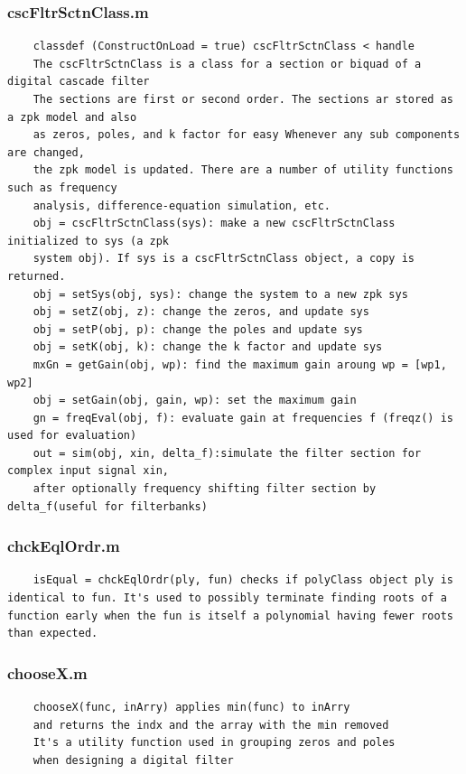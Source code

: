 \documentclass[]{article}
\begin{document}
\subsubsection*{cscFltrSctnClass.m}
\begin{lstlisting}
    classdef (ConstructOnLoad = true) cscFltrSctnClass < handle
    The cscFltrSctnClass is a class for a section or biquad of a digital cascade filter
    The sections are first or second order. The sections ar stored as a zpk model and also
    as zeros, poles, and k factor for easy Whenever any sub components are changed,
    the zpk model is updated. There are a number of utility functions such as frequency
    analysis, difference-equation simulation, etc.
    obj = cscFltrSctnClass(sys): make a new cscFltrSctnClass initialized to sys (a zpk
    system obj). If sys is a cscFltrSctnClass object, a copy is returned.
    obj = setSys(obj, sys): change the system to a new zpk sys
    obj = setZ(obj, z): change the zeros, and update sys
    obj = setP(obj, p): change the poles and update sys
    obj = setK(obj, k): change the k factor and update sys
    mxGn = getGain(obj, wp): find the maximum gain aroung wp = [wp1, wp2]
    obj = setGain(obj, gain, wp): set the maximum gain
    gn = freqEval(obj, f): evaluate gain at frequencies f (freqz() is used for evaluation)
    out = sim(obj, xin, delta_f):simulate the filter section for complex input signal xin,
    after optionally frequency shifting filter section by delta_f(useful for filterbanks)
\end{lstlisting}

\subsubsection*{chckEqlOrdr.m}
\begin{lstlisting}
    isEqual = chckEqlOrdr(ply, fun) checks if polyClass object ply is identical to fun. It's used to possibly terminate finding roots of a function early when the fun is itself a polynomial having fewer roots than expected.
\end{lstlisting}

\subsubsection*{chooseX.m}
\begin{lstlisting}
    chooseX(func, inArry) applies min(func) to inArry
    and returns the indx and the array with the min removed
    It's a utility function used in grouping zeros and poles
    when designing a digital filter
\end{lstlisting}
\end{document}

